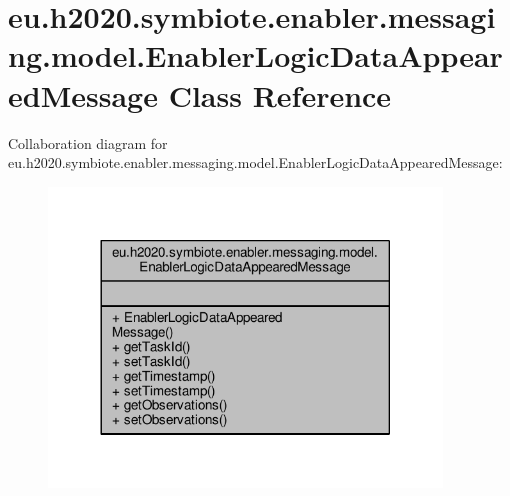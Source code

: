 \hypertarget{classeu_1_1h2020_1_1symbiote_1_1enabler_1_1messaging_1_1model_1_1EnablerLogicDataAppearedMessage}{}\section{eu.\+h2020.\+symbiote.\+enabler.\+messaging.\+model.\+Enabler\+Logic\+Data\+Appeared\+Message Class Reference}
\label{classeu_1_1h2020_1_1symbiote_1_1enabler_1_1messaging_1_1model_1_1EnablerLogicDataAppearedMessage}


Collaboration diagram for eu.\+h2020.\+symbiote.\+enabler.\+messaging.\+model.\+Enabler\+Logic\+Data\+Appeared\+Message\+:\nopagebreak
\begin{figure}[H]
\begin{center}
\leavevmode
\includegraphics[width=296pt]{classeu_1_1h2020_1_1symbiote_1_1enabler_1_1messaging_1_1model_1_1EnablerLogicDataAppearedMessage__coll__graph}
\end{center}
\end{figure}
